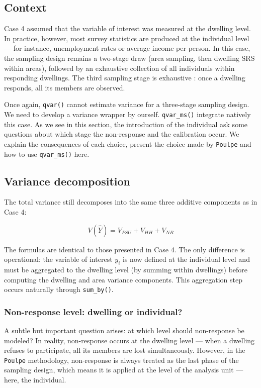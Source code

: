 \documentclass[
]{article}
\begin{document}
\subsection{Context}\label{context-4}

Case 4 assumed that the variable of interest was measured at the
dwelling level. In practice, however, most survey statistics are
produced at the individual level --- for instance, unemployment rates or
average income per person. In this case, the sampling design remains a
two-stage draw (area sampling, then dwelling SRS within areas), followed
by an exhaustive collection of all individuals within responding
dwellings. The third sampling stage is exhaustive : once a dwelling
responds, all its members are observed.

Once again, \texttt{qvar()} cannot estimate variance for a three-stage
sampling design. We need to develop a variance wrapper by ourself.
\texttt{qvar\_ms()} integrate natively this case. As we see in this
section, the introduction of the individual ask some questions about
which stage the non-response and the calibration occur. We explain the
consequences of each choice, present the choice made by \texttt{Poulpe}
and how to use \texttt{qvar\_ms()} here.

\subsection{Variance decomposition}\label{variance-decomposition-4}

The total variance still decomposes into the same three additive
components as in Case 4:

\[V(\hat{Y})=V_{PSU}+V_{HH}+V_{NR}\]

The formulas are identical to those presented in Case 4. The only
difference is operational: the variable of interest \(y_i\) is now
defined at the individual level and must be aggregated to the dwelling
level (by summing within dwellings) before computing the dwelling and
area variance components. This aggregation step occurs naturally through
\texttt{sum\_by()}.

\subsubsection{Non-response level: dwelling or
individual?}\label{non-response-level-dwelling-or-individual}

A subtle but important question arises: at which level should
non-response be modeled? In reality, non-response occurs at the dwelling
level --- when a dwelling refuses to participate, all its members are
lost simultaneously. However, in the \texttt{Poulpe} methodology,
non-response is always treated as the last phase of the sampling design,
which means it is applied at the level of the analysis unit --- here,
the individual.
\end{document}

